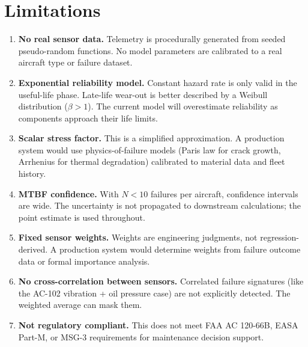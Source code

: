 \documentclass[11pt, a4paper]{report}
\begin{document}
\chapter{Limitations}
\label{ch:limitations}

\begin{enumerate}
  \item \textbf{No real sensor data.} Telemetry is procedurally generated from
        seeded pseudo-random functions. No model parameters are calibrated to a
        real aircraft type or failure dataset.

  \item \textbf{Exponential reliability model.} Constant hazard rate is only
        valid in the useful-life phase. Late-life wear-out is better described
        by a Weibull distribution ($\beta > 1$). The current model will
        overestimate reliability as components approach their life limits.

  \item \textbf{Scalar stress factor.} This is a simplified approximation. A
        production system would use physics-of-failure models (Paris law for
        crack growth, Arrhenius for thermal degradation) calibrated to material
        data and fleet history.

  \item \textbf{MTBF confidence.} With $N < 10$ failures per aircraft, confidence
        intervals are wide. The uncertainty is not propagated to downstream
        calculations; the point estimate is used throughout.

  \item \textbf{Fixed sensor weights.} Weights are engineering judgments, not
        regression-derived. A production system would determine weights from
        failure outcome data or formal importance analysis.

  \item \textbf{No cross-correlation between sensors.} Correlated failure
        signatures (like the AC-102 vibration + oil pressure case) are not
        explicitly detected. The weighted average can mask them.

  \item \textbf{Not regulatory compliant.} This does not meet FAA AC 120-66B,
        EASA Part-M, or MSG-3 requirements for maintenance decision support.
\end{enumerate}

\end{document}
